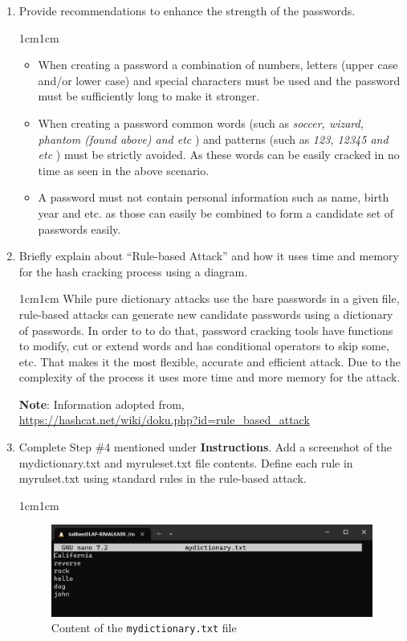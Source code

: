 \documentclass[11pt,letterpaper]{article}
\newenvironment{answer}{\em \color{blue} \begin{adjustwidth}{1cm}{1cm}}{\end{adjustwidth}}
\begin{document}
\begin{enumerate}
		\item Provide recommendations to enhance the strength of the passwords.
		
		\begin{answer}
		\begin{itemize}
			\item When creating a password a combination of numbers, letters (upper case and/or lower case)  and special characters must be used and the password must be sufficiently long to make it stronger.				
			
			\item When creating a password common words (such as \textit{soccer, wizard, phantom (found above)  and etc} ) and patterns (such as \textit{123, 12345 and etc} ) must be strictly avoided. As these words can be easily cracked in no time as seen in the above scenario.					
			
			\item A password must not contain personal information such as name, birth year and etc. as those can easily be combined to form a candidate set of passwords easily.
		\end{itemize}
		\end{answer}
		
		\item Briefly explain about ``Rule-based Attack'' and how it uses time and memory for the hash cracking process using a diagram.
		
		\begin{answer}
			While pure dictionary attacks use the bare passwords in a given file, rule-based attacks can generate new candidate passwords using a dictionary of passwords. In order to to do that, password cracking tools have functions to modify, cut or extend words and has conditional operators to skip some, etc. That makes it the most flexible, accurate and efficient attack. Due to the complexity of the process it uses more time and more memory for the attack.
		\end{answer}
	
		\textbf{Note}: Information adopted from,  \\\url{https://hashcat.net/wiki/doku.php?id=rule_based_attack}
		
		\item Complete Step \#4 mentioned under \textbf{Instructions}. Add a screenshot of the mydictionary.txt and myruleset.txt file contents. Define each rule in myrulset.txt using standard rules in the rule-based attack.
		
		\begin{answer}
			\begin{figure}[h]
				\centering
				\includegraphics[width=0.7\columnwidth]{images/mydict}
				\caption{Content of the {\tt mydictionary.txt} file} \label{fig:mydict}
			\end{figure}
		

\end{answer}
\end{enumerate}
\end{document}
